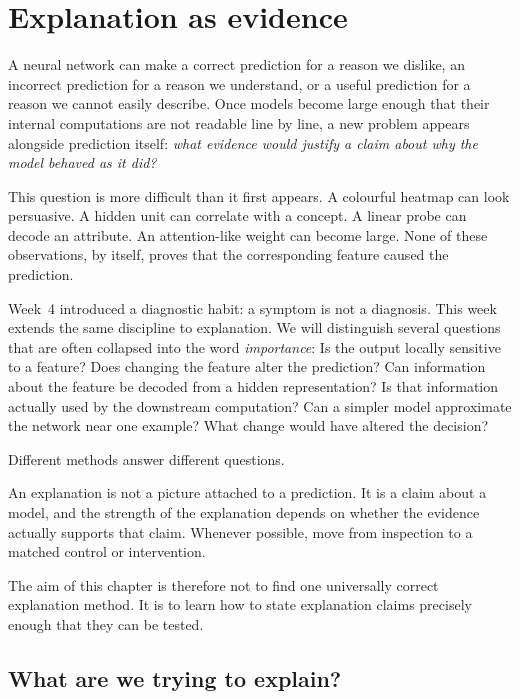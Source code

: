 \chapter{Explanation as evidence}
\label{chap:week06}

A neural network can make a correct prediction for a reason we dislike, an incorrect prediction for a reason we understand, or a useful prediction for a reason we cannot easily describe. Once models become large enough that their internal computations are not readable line by line, a new problem appears alongside prediction itself: \emph{what evidence would justify a claim about why the model behaved as it did?}

This question is more difficult than it first appears. A colourful heatmap can look persuasive. A hidden unit can correlate with a concept. A linear probe can decode an attribute. An attention-like weight can become large. None of these observations, by itself, proves that the corresponding feature caused the prediction.

Week~4 introduced a diagnostic habit: a symptom is not a diagnosis. This week extends the same discipline to explanation. We will distinguish several questions that are often collapsed into the word \emph{importance}: Is the output locally sensitive to a feature? Does changing the feature alter the prediction? Can information about the feature be decoded from a hidden representation? Is that information actually used by the downstream computation? Can a simpler model approximate the network near one example? What change would have altered the decision?

Different methods answer different questions.

\begin{keyidea}
An explanation is not a picture attached to a prediction. It is a claim about a model, and the strength of the explanation depends on whether the evidence actually supports that claim. Whenever possible, move from inspection to a matched control or intervention.
\end{keyidea}

The aim of this chapter is therefore not to find one universally correct explanation method. It is to learn how to state explanation claims precisely enough that they can be tested.

\section{What are we trying to explain?}

